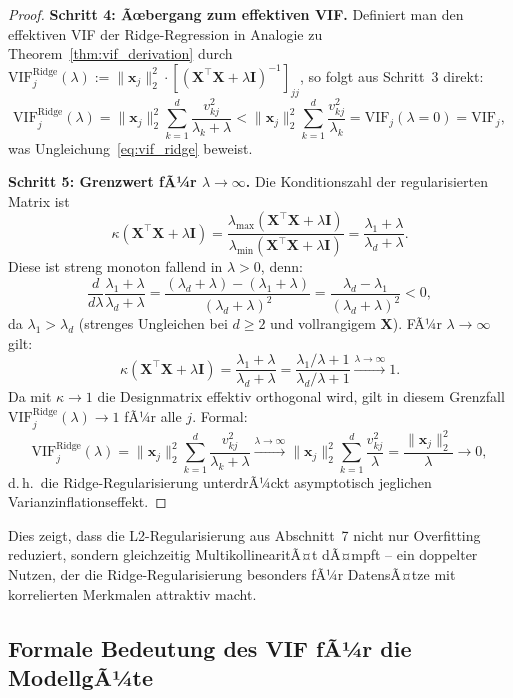﻿\documentclass[12pt, a4paper]{article}
\theoremstyle{definition}
\theoremstyle{remark}
\newcommand{\vx}{\bm{x}}
\newcommand{\vX}{\bm{X}}
\newcommand{\T}{\top}
\begin{document}
\begin{proof}
	\textbf{Schritt 4: Ãœbergang zum effektiven VIF.}
	Definiert man den effektiven VIF der Ridge-Regression in Analogie zu Theorem~\ref{thm:vif_derivation}
	durch $\mathrm{VIF}_j^{\mathrm{Ridge}}(\lambda) := \|\vx_j\|_2^2 \cdot [(\vX^\T\vX+\lambda\bm{I})^{-1}]_{jj}$,
	so folgt aus Schritt~3 direkt:
	\[
	\mathrm{VIF}_j^{\mathrm{Ridge}}(\lambda)
	= \|\vx_j\|_2^2 \sum_{k=1}^d \frac{v_{kj}^2}{\lambda_k+\lambda}
	< \|\vx_j\|_2^2 \sum_{k=1}^d \frac{v_{kj}^2}{\lambda_k}
	= \mathrm{VIF}_j(\lambda=0) = \mathrm{VIF}_j,
	\]
	was Ungleichung~\eqref{eq:vif_ridge} beweist.
	
	\textbf{Schritt 5: Grenzwert fÃ¼r $\lambda \to \infty$.}
	Die Konditionszahl der regularisierten Matrix ist
	\[
	\kappa(\vX^\T\vX + \lambda\bm{I})
	= \frac{\lambda_{\max}(\vX^\T\vX+\lambda\bm{I})}{\lambda_{\min}(\vX^\T\vX+\lambda\bm{I})}
	= \frac{\lambda_1 + \lambda}{\lambda_d + \lambda}.
	\]
	Diese ist streng monoton fallend in $\lambda > 0$, denn:
	\[
	\frac{d}{d\lambda}\frac{\lambda_1+\lambda}{\lambda_d+\lambda}
	= \frac{(\lambda_d+\lambda) - (\lambda_1+\lambda)}{(\lambda_d+\lambda)^2}
	= \frac{\lambda_d - \lambda_1}{(\lambda_d+\lambda)^2} < 0,
	\]
	da $\lambda_1 > \lambda_d$ (strenges Ungleichen bei $d \geq 2$ und vollrangigem $\vX$). FÃ¼r
	$\lambda \to \infty$ gilt:
	\[
	\kappa(\vX^\T\vX + \lambda\bm{I}) = \frac{\lambda_1+\lambda}{\lambda_d+\lambda}
	= \frac{\lambda_1/\lambda + 1}{\lambda_d/\lambda + 1} \xrightarrow{\lambda\to\infty} 1.
	\]
	Da mit $\kappa \to 1$ die Designmatrix effektiv orthogonal wird, gilt in diesem Grenzfall
	$\mathrm{VIF}_j^{\mathrm{Ridge}}(\lambda) \to 1$ fÃ¼r alle $j$. Formal:
	\[
	\mathrm{VIF}_j^{\mathrm{Ridge}}(\lambda)
	= \|\vx_j\|_2^2 \sum_{k=1}^d \frac{v_{kj}^2}{\lambda_k+\lambda}
	\xrightarrow{\lambda\to\infty} \|\vx_j\|_2^2 \sum_{k=1}^d \frac{v_{kj}^2}{\lambda}
	= \frac{\|\vx_j\|_2^2}{\lambda} \to 0,
	\]
	d.\,h.\ die Ridge-Regularisierung unterdrÃ¼ckt asymptotisch jeglichen Varianzinflationseffekt.
\end{proof}

Dies zeigt, dass die L2-Regularisierung aus Abschnitt~7 nicht nur Overfitting reduziert,
sondern gleichzeitig MultikollinearitÃ¤t dÃ¤mpft -- ein doppelter Nutzen, der die
Ridge-Regularisierung besonders fÃ¼r DatensÃ¤tze mit korrelierten Merkmalen attraktiv macht.

\subsection{Formale Bedeutung des VIF fÃ¼r die ModellgÃ¼te}
\end{document}
